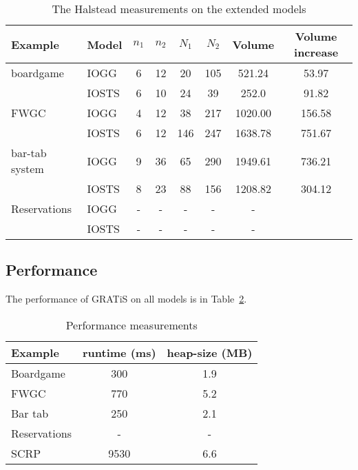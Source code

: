 \begin{table}[ht]
\begin{center}
\begin{tabular}{| l | l | c | c | c | c | c | c |}
  \hline
  \textbf{Example} & \textbf{Model} & $n_1$ & $n_2$ & $N_1$ & $N_2$ & Volume & Volume increase \\ \hline
  boardgame & IOGG & 6 & 12 & 20 & 105 & 521.24 & 53.97 \\ \cline{2-7}
  & IOSTS & 6 & 10 & 24 & 39 & 252.0 & 91.82\\ \hline
  FWGC & IOGG & 4 & 12 & 38 & 217 & 1020.00 & 156.58 \\ \cline{2-7}
  & IOSTS & 6 & 12 & 146 & 247 & 1638.78 & 751.67\\ \hline
  bar-tab system & IOGG & 9 & 36 & 65 & 290 & 1949.61 & 736.21 \\ \cline{2-7}
  & IOSTS & 8 & 23 & 88 & 156 & 1208.82 & 304.12 \\ \hline
  Reservations & IOGG & - & - & - & - & - \\ \cline{2-7}
  & IOSTS & - & - & - & - & - \\ \hline
\end{tabular}
\end{center}
\caption{The Halstead measurements on the extended models}
\label{tab:halstead-extended}
\end{table}

\subsection{Performance}
The performance of GRATiS on all models is in Table~\ref{tab:performance}.

\begin{table}[ht]
\begin{center}
\begin{tabular}{|l|c|c|}
\hline
\textbf{Example} & \textbf{runtime (ms)} & \textbf{heap-size (MB)} \\ \hline
Boardgame & 300 & 1.9 \\ \hline
FWGC & 770 & 5.2 \\ \hline
Bar tab & 250 & 2.1 \\ \hline
Reservations & - & - \\ \hline
SCRP & 9530 & 6.6 \\ \hline
\end{tabular}
\end{center}
\caption{Performance measurements}
\label{tab:performance}
\end{table}

